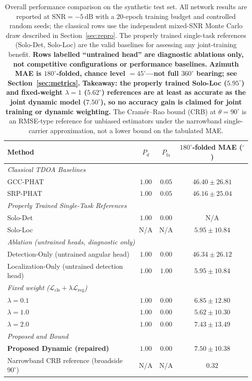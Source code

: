 \documentclass[sensors,article,submit,pdftex,moreauthors]{Definitions/mdpi}
\begin{document}
\begin{table}[H]
\renewcommand{\arraystretch}{1.2}
\caption{Overall performance comparison on the synthetic test set. All network results are reported at $\mathrm{SNR}=-5\,\mathrm{dB}$ with a 20-epoch training budget and controlled random seeds; the classical rows use the independent mixed-SNR Monte Carlo draw described in Section~\ref{sec:repro}. The properly trained single-task references (Solo-Det, Solo-Loc) are the valid baselines for assessing any joint-training benefit. \textbf{Rows labelled ``untrained head'' are diagnostic ablations only, not competitive configurations or performance baselines.} \textbf{Azimuth MAE is $180^\circ$-folded, chance level $=45^\circ$---not full $360^\circ$ bearing; see Section~\ref{sec:metrics}.} \textbf{Takeaway: the properly trained Solo-Loc ($5.95^\circ$) and fixed-weight $\lambda=1$ ($5.62^\circ$) references are at least as accurate as the joint dynamic model ($7.50^\circ$), so no accuracy gain is claimed for joint training or dynamic weighting.} The Cram\'er--Rao bound (CRB) at $\theta=90^\circ$ is an RMSE-type reference for unbiased estimators under the narrowband single-carrier approximation, not a lower bound on the tabulated MAE.}
\label{tab:overall_compare}
\centering
\begin{tabular}{lccc}
\toprule
Method & $P_d$ & $P_{\mathrm{fa}}$ & $180^\circ$-folded MAE ($^\circ$) \\
\midrule
\multicolumn{4}{l}{\textit{Classical TDOA Baselines}} \\
GCC-PHAT~\cite{knapp1976gcc} & $1.00$ & $0.05$ & $46.40\pm26.81$ \\
SRP-PHAT~\cite{dibiase2001srp} & $1.00$ & $0.05$ & $46.16\pm25.04$ \\
\midrule
\multicolumn{4}{l}{\textit{Properly Trained Single-Task References}} \\
Solo-Det & $1.00$ & $0.00$ & N/A \\
Solo-Loc & N/A & N/A & $5.95\pm10.84$ \\
\midrule
\multicolumn{4}{l}{\textit{Ablation (untrained heads, diagnostic only)}} \\
Detection-Only (untrained angular head) & $1.00$ & $0.00$ & $46.34\pm26.12$ \\
Localization-Only (untrained detection head) & $1.00$ & $1.00$ & $5.95\pm10.84$ \\
\midrule
\multicolumn{4}{l}{\textit{Fixed weight ($\mathcal{L}_{\mathrm{cls}}+\lambda\mathcal{L}_{\mathrm{reg}}$)}} \\
$\lambda=0.1$ & $1.00$ & $0.00$ & $6.85\pm12.80$ \\
$\lambda=1.0$ & $1.00$ & $0.00$ & $5.62\pm10.30$ \\
$\lambda=2.0$ & $1.00$ & $0.00$ & $7.43\pm13.49$ \\
\midrule
\multicolumn{4}{l}{\textit{Proposed and Bound}} \\
\textbf{Proposed Dynamic (repaired)} & $\mathbf{1.00}$ & $\mathbf{0.00}$ & $\mathbf{7.50\pm10.38}$ \\
Narrowband CRB reference (broadside $90^\circ$) & N/A & N/A & $0.32$ \\
\bottomrule
\end{tabular}
\end{table}
\end{document}
